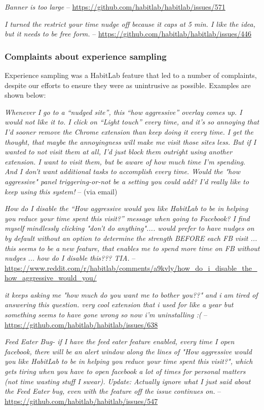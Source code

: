 \textit{Banner is too large} -- \url{https://github.com/habitlab/habitlab/issues/571}

\textit{I turned the restrict your time nudge off because it caps at 5 min. I like the idea, but it needs to be free form.} -- \url{https://github.com/habitlab/habitlab/issues/446}

\subsubsection{Complaints about experience sampling}

Experience sampling was a HabitLab feature that led to a number of complaints, despite our efforts to ensure they were as unintrusive as possible. Examples are shown below:

\textit{Whenever I go to a ``nudged site'', this ``how aggressive'' overlay comes up. I would not like it to. I click on ``Light touch'' every time, and it's so annoying that I'd sooner remove the Chrome extension than keep doing it every time. I get the thought, that maybe the annoyingness will make me visit those sites less. But if I wanted to not visit them at all, I'd just block them outright using another extension. I want to visit them, but be aware of how much time I'm spending. And I don't want additional tasks to accomplish every time. Would the "how aggressive" panel triggering-or-not be a setting you could add? I'd really like to keep using this system!} -- (via email)

\textit{How do I disable the ``How aggressive would you like HabitLab to be in helping you reduce your time spent this visit?'' message when going to Facebook? I find myself mindlessly clicking "don't do anything".... would prefer to have nudges on by default without an option to determine the strength BEFORE each FB visit ... this seems to be a new feature, that enables me to spend more time on FB without nudges ... how do I disable this??? TIA.} -- \url{https://www.reddit.com/r/habitlab/comments/a9kvly/how_do_i_disable_the_how_aggressive_would_you/}

\textit{it keeps asking me "how much do you want me to bother you??" and i am tired of answering this question. very cool extension that i used for like a year but something seems to have gone wrong so now i'm uninstalling :(} -- \url{https://github.com/habitlab/habitlab/issues/638}

\textit{Feed Eater Bug- if I have the feed eater feature enabled, every time I open facebook, there will be an alert window along the lines of "How aggressive would you like HabitLab to be in helping you reduce your time spent this visit?", which gets tiring when you have to open facebook a lot of times for personal matters (not time wasting stuff I swear). Update: Actually ignore what I just said about the Feed Eater bug, even with the feature off the issue continues on.} -- \url{https://github.com/habitlab/habitlab/issues/547}


